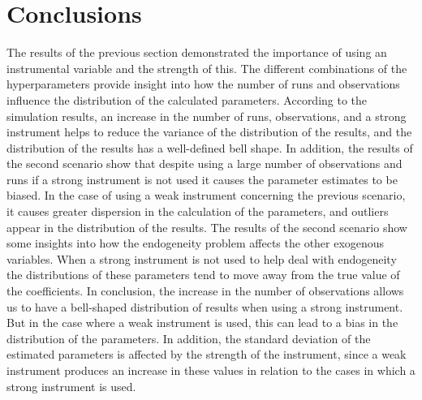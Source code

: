 \documentclass{article}
\begin{document}
\section{Conclusions}
The results of the previous section demonstrated the importance of using an instrumental variable and the strength of this. The different combinations of the hyperparameters provide insight into how the number of runs and observations influence the distribution of the calculated parameters. According to the simulation results, an increase in the number of runs, observations, and a strong instrument helps to reduce the variance of the distribution of the results, and the distribution of the results has a well-defined bell shape. In addition, the results of the second scenario show that despite using a large number of observations and runs if a strong instrument is not used it causes the parameter estimates to be biased. In the case of using a weak instrument concerning the previous scenario, it causes greater dispersion in the calculation of the parameters, and outliers appear in the distribution of the results.
The results of the second scenario show some insights into how the endogeneity problem affects the other exogenous variables. When a strong instrument is not used to help deal with endogeneity the distributions of these parameters tend to move away from the true value of the coefficients. 
In conclusion, the increase in the number of observations allows us to have a bell-shaped distribution of results when using a strong instrument. But in the case where a weak instrument is used, this can lead to a bias in the distribution of the parameters. In addition, the standard deviation of the estimated parameters is affected by the strength of the instrument, since a weak instrument produces an increase in these values in relation to the cases in which a strong instrument is used.
\end{document}
